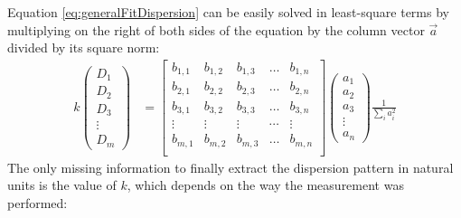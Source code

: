 Equation \ref{eq:generalFitDispersion} can be easily solved in least-square terms by multiplying 
on the right of both sides of the equation by the column vector $\vec{a}$ divided by its square norm:
%
\begin{align}
k
\begin{pmatrix}
D_1 \\
D_2 \\
D_3 \\
\vdots \\
D_m
\end{pmatrix}
&=
\begin{bmatrix}
   b_{1,1} & b_{1,2} & b_{1,3} & \ldots & b_{1,n} \\
   b_{2,1} & b_{2,2} & b_{2,3} & \ldots & b_{2,n} \\
   b_{3,1} & b_{3,2} & b_{3,3} & \ldots & b_{3,n} \\
   \vdots &\vdots &\vdots &\cdots &\vdots \\
   b_{m,1} & b_{m,2} & b_{m,3} & \ldots & b_{m,n} \\
\end{bmatrix}
\begin{pmatrix}
a_1 \\
a_2 \\
a_3 \\
\vdots \\
a_n
\end{pmatrix}
\frac{1}{\sum_i a_i^2}
\label{eq:genericFitDispersionFormula}
\end{align}
%
The only missing information to finally extract the dispersion pattern in natural units is
the value of $k$, which depends on the way the measurement was performed:
%
